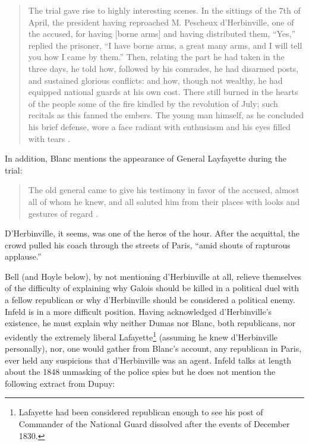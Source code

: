 \documentclass[12pt]{article}
\begin{document}
\begin{quote}
The trial gave rise to highly interesting scenes. In the sittings of the 7th of April, the president having reproached M. Pescheux d'Herbinville, one of the accused, for having [borne arms] and having distributed them, ``Yes,'' replied the prisoner, ``I have borne arms, a great many arms, and I will tell you how I came by them.'' Then, relating the part he had taken in the three days, he told how, followed by his comrades, he had disarmed posts, and sustained glorious conflicts: and how, though not wealthy, he had equipped national guards at his own cost. There still burned in the hearts of the people some of the fire kindled by the revolution of July; such recitals as this fanned the embers. The young man himself, as he concluded his brief defense, wore a face radiant with enthusiasm and his eyes filled with tears \cite{83}.
\end{quote}
In addition, Blanc mentions the appearance of General Layfayette during the trial:

\begin{quote}
The old general came to give his testimony in favor of the accused, almost all of whom he knew, and all saluted him from their places with looks and gestures of regard \cite{84}.
\end{quote}
D'Herbinville, it seems, was one of the heros of the hour. After the acquittal, the crowd pulled his coach through the streets of Paris, ``amid shouts of rapturous applause.''

Bell (and Hoyle below), by not mentioning d'Herbinville at all, relieve themselves of the difficulty of explaining why Galois should be killed in a political duel with a fellow republican or why d'Herbinville should be considered a political enemy. Infeld is in a more difficult position. Having acknowledged d'Herbinville's existence, he must explain why neither Dumas nor Blanc, both republicans, nor evidently the extremely liberal Lafayette\footnote{Lafayette had been considered republican enough to see his post of Commander of the National Guard dissolved after the events of December 1830.} (assuming he knew d'Herbinville personally), nor, one would gather from Blanc's account, any republican in Paris, ever held any suspicions that d'Herbinville was an agent. Infeld talks at length about the 1848 unmasking of the police spies but he does not mention the following extract from Dupuy:
\end{document}
